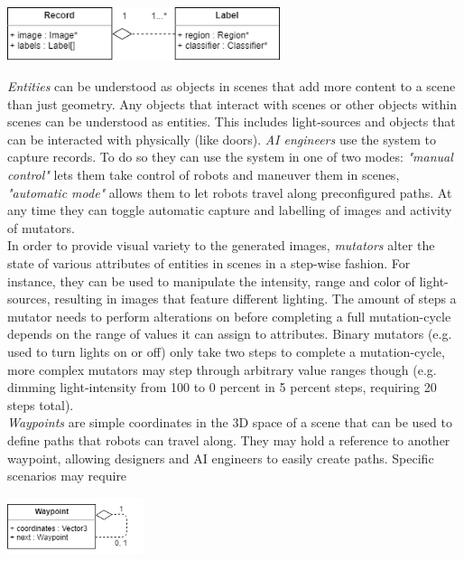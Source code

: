 \begin{center}
\noindent\includegraphics[width=8cm]{tex/img/ch04/Classes_Record01.png}
\label{fig:classes-record}
\end{center}
\textit{Entities} can be understood as objects in scenes that add more content to a scene than just geometry. Any objects that interact with scenes or other objects within scenes can be understood as entities. This includes light-sources and objects that can be interacted with physically (like doors).
\textit{\acs{AI} engineers} use the system to capture records. To do so they can use the system in one of two modes: \textit{"manual control"} lets them take control of robots and maneuver them in scenes, \textit{"automatic mode"} allows them to let robots travel along preconfigured paths. At any time they can toggle automatic capture and labelling of images and activity of mutators.\\
In order to provide visual variety to the generated images, \textit{mutators} alter the state of various attributes of entities in scenes in a step-wise fashion. For instance, they can be used to manipulate the intensity, range and color of light-sources, resulting in images that feature different lighting. The amount of steps a mutator needs to perform alterations on before completing a full mutation-cycle depends on the range of values it can assign to attributes. Binary mutators (e.g. used to turn lights on or off) only take two steps to complete a mutation-cycle, more complex mutators may step through arbitrary value ranges though (e.g. dimming light-intensity from 100 to 0 percent in 5 percent steps, requiring 20 steps total). \\
\textit{Waypoints} are simple coordinates in the 3D space of a scene that can be used to define paths that robots can travel along. They may hold a reference to another waypoint, allowing designers and \acs{AI} engineers to easily create paths. Specific scenarios may require  
\begin{center}
\noindent\includegraphics[width=4cm]{tex/img/ch04/Classes_Waypoint02.png}
\label{fig:classes-waypoint}
\end{center}

